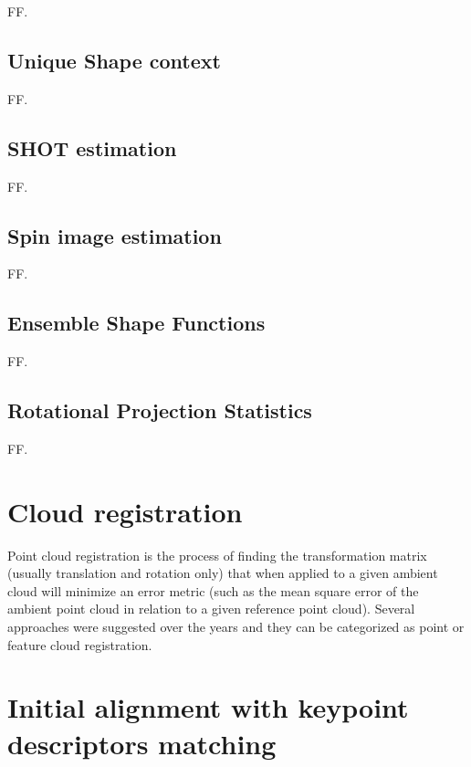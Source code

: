FF.


\subsection{Unique Shape context}

FF.


\subsection{SHOT estimation}

FF.


\subsection{Spin image estimation}

FF.


\subsection{Ensemble Shape Functions}

FF.


\subsection{Rotational Projection Statistics}

FF.


\section{Cloud registration}

Point cloud registration is the process of finding the transformation matrix (usually translation and rotation only) that when applied to a given ambient cloud will minimize an error metric (such as the mean square error of the ambient point cloud in relation to a given reference point cloud). Several approaches were suggested over the years and they can be categorized as point or feature cloud registration.



\section{Initial alignment with keypoint descriptors matching}


